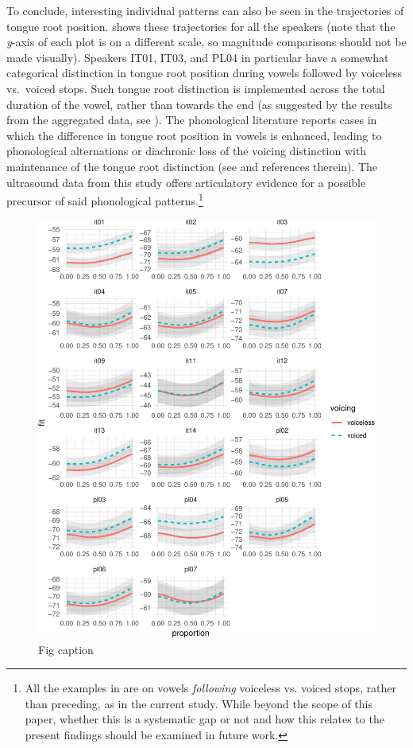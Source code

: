 \documentclass[12pt,]{article}
\let\rmarkdownfootnote\footnote%
\def\footnote{\protect\rmarkdownfootnote}
\begin{document}
To conclude, interesting individual patterns can also be seen in the
trajectories of tongue root position.  shows
these trajectories for all the speakers (note that the \emph{y}-axis of
each plot is on a different scale, so magnitude comparisons should not
be made visually). Speakers IT01, IT03, and PL04 in particular have a
somewhat categorical distinction in tongue root position during vowels
followed by voiceless vs.~voiced stops. Such tongue root distinction is
implemented across the total duration of the vowel, rather than towards
the end (as suggested by the results from the aggregated data, see
). The phonological literature reports cases in which the
difference in tongue root position in vowels is enhanced, leading to
phonological alternations or diachronic loss of the voicing distinction
with maintenance of the tongue root distinction (see \citet{vaux1996}
and references therein). The ultrasound data from this study offers
articulatory evidence for a possible precursor of said phonological
patterns.\footnote{All the examples in \citet{vaux1996} are on vowels \textit{following} voiceless vs. voiced stops, rather than preceding, as in the current study. While beyond the scope of this paper, whether this is a systematic gap or not and how this relates to the present findings should be examined in future work.}

\begin{figure}
\includegraphics[width=\linewidth]{2018-tra_files/figure-latex/tra-gam-s-ar-plot-1} \caption{Fig caption}\label{f:tra-gam-s-ar-plot}
\end{figure}
\end{document}
